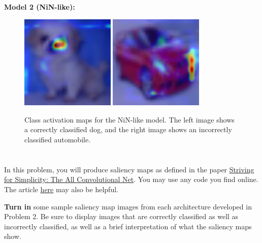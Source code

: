 \documentclass{article}[12pt]
\begin{document}
\textbf{Model 2 (NiN-like):}
\begin{figure}[H]
    \centering
        \caption{Class activation maps for the NiN-like model. The left image shows a correctly classified dog, and the right image shows an incorrectly classified automobile.}
        \includegraphics[width=0.4\textwidth]{CAM_correct_dog4_newmodel.png}
        \includegraphics[width=0.4\textwidth]{CAM_incorrect_automobile10_newmodel.png}
\end{figure}

\section{}

In this problem, you will produce saliency maps as defined in the paper \href{https://arxiv.org/pdf/1412.6806.pdf}{Striving for Simplicity: The All Convolutional Net}. You may use any code you find online. The article \href{https://www.coderskitchen.com/guided-backpropagation-with-pytorch-and-tensorflow/}{here} may also be helpful.

\textbf{Turn in} some sample saliency map images from each architecture developed in Problem 2. Be sure to display images that are correctly classified as well as incorrectly classified, as well as a brief interpretation of what the saliency maps show.
\end{document}
